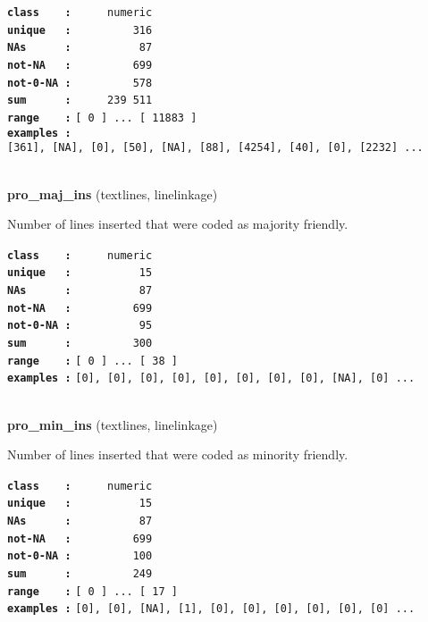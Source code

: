 \documentclass[]{article}
\begin{document}
\textbf{\texttt{class\ \ \ \ :}} \texttt{~~~~~numeric}\\
\textbf{\texttt{unique\ \ \ :}} \texttt{~~~~~~~~~316}\\
\textbf{\texttt{NAs\ \ \ \ \ \ :}} \texttt{~~~~~~~~~~87}\\
\textbf{\texttt{not-NA\ \ \ :}} \texttt{~~~~~~~~~699}\\
\textbf{\texttt{not-0-NA\ :}} \texttt{~~~~~~~~~578}\\
\textbf{\texttt{sum\ \ \ \ \ \ :}} \texttt{~~~~~239~511}\\
\textbf{\texttt{range\ \ \ \ :}}
\texttt{{[}\ 0\ {]}\ ...\ {[}\ 11883\ {]}}\\
\textbf{\texttt{examples\ :}}
\texttt{{[}361{]},\ {[}NA{]},\ {[}0{]},\ {[}50{]},\ {[}NA{]},\ {[}88{]},\ {[}4254{]},\ {[}40{]},\ {[}0{]},\ {[}2232{]}\ ...}\\

~

\textbf{pro\_maj\_ins} (textlines, linelinkage)

Number of lines inserted that were coded as majority friendly.

\textbf{\texttt{class\ \ \ \ :}} \texttt{~~~~~numeric}\\
\textbf{\texttt{unique\ \ \ :}} \texttt{~~~~~~~~~~15}\\
\textbf{\texttt{NAs\ \ \ \ \ \ :}} \texttt{~~~~~~~~~~87}\\
\textbf{\texttt{not-NA\ \ \ :}} \texttt{~~~~~~~~~699}\\
\textbf{\texttt{not-0-NA\ :}} \texttt{~~~~~~~~~~95}\\
\textbf{\texttt{sum\ \ \ \ \ \ :}} \texttt{~~~~~~~~~300}\\
\textbf{\texttt{range\ \ \ \ :}}
\texttt{{[}\ 0\ {]}\ ...\ {[}\ 38\ {]}}\\
\textbf{\texttt{examples\ :}}
\texttt{{[}0{]},\ {[}0{]},\ {[}0{]},\ {[}0{]},\ {[}0{]},\ {[}0{]},\ {[}0{]},\ {[}0{]},\ {[}NA{]},\ {[}0{]}\ ...}\\

~

\textbf{pro\_min\_ins} (textlines, linelinkage)

Number of lines inserted that were coded as minority friendly.

\textbf{\texttt{class\ \ \ \ :}} \texttt{~~~~~numeric}\\
\textbf{\texttt{unique\ \ \ :}} \texttt{~~~~~~~~~~15}\\
\textbf{\texttt{NAs\ \ \ \ \ \ :}} \texttt{~~~~~~~~~~87}\\
\textbf{\texttt{not-NA\ \ \ :}} \texttt{~~~~~~~~~699}\\
\textbf{\texttt{not-0-NA\ :}} \texttt{~~~~~~~~~100}\\
\textbf{\texttt{sum\ \ \ \ \ \ :}} \texttt{~~~~~~~~~249}\\
\textbf{\texttt{range\ \ \ \ :}}
\texttt{{[}\ 0\ {]}\ ...\ {[}\ 17\ {]}}\\
\textbf{\texttt{examples\ :}}
\texttt{{[}0{]},\ {[}0{]},\ {[}NA{]},\ {[}1{]},\ {[}0{]},\ {[}0{]},\ {[}0{]},\ {[}0{]},\ {[}0{]},\ {[}0{]}\ ...}\\
\end{document}
